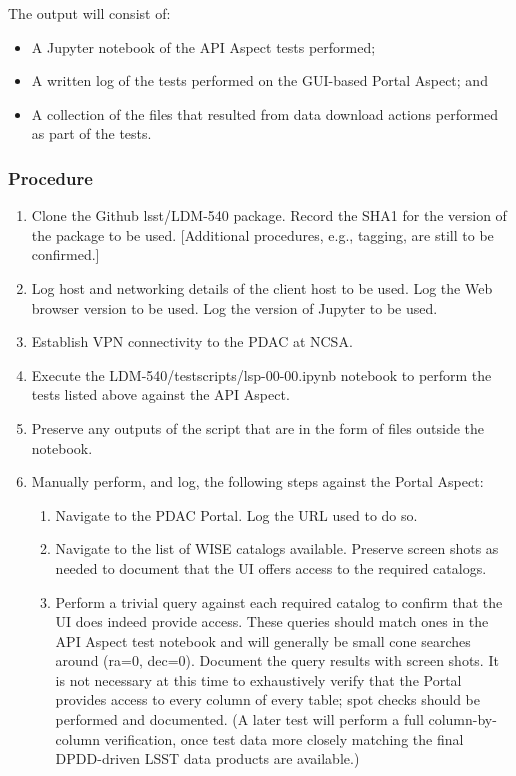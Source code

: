 The output will consist of:

\begin{itemize}
  \item{A Jupyter notebook of the API Aspect tests performed;}
  \item{A written log of the tests performed on the GUI-based Portal Aspect; and}
  \item{A collection of the files that resulted from data download actions performed as part of the tests.}
\end{itemize}


\subsubsection{Procedure}

\begin{enumerate}

  \item{Clone the Github lsst/LDM-540 package.  Record the SHA1 for the version of the package to be used.  [Additional procedures, e.g., tagging, are still to be confirmed.]}
  \item{Log host and networking details of the client host to be used.
 Log the Web browser version to be used.
 Log the version of Jupyter to be used.}
  \item{Establish VPN connectivity to the PDAC at NCSA.}
  \item{Execute the LDM-540/test\textunderscore scripts/lsp-00-00.ipynb notebook to perform the tests listed above against the API Aspect.}
  \item{Preserve any outputs of the script that are in the form of files outside the notebook.}
  \item{Manually perform, and log, the following steps against the Portal Aspect:
    \begin{enumerate}
      \item{Navigate to the PDAC Portal.  Log the URL used to do so.}
      \item{Navigate to the list of WISE catalogs available.  Preserve screen shots as needed to document that the UI offers access to the required catalogs.}
      \item{Perform a trivial query against each required catalog to confirm that the UI does indeed provide access.
 These queries should match ones in the API Aspect test notebook and will generally be small cone searches around (ra=0, dec=0).
 Document the query results with screen shots.
 It is not necessary at this time to exhaustively verify that the Portal provides access to every column of every table; spot checks should be performed and documented.
 (A later test will perform a full column-by-column verification, once test data more closely matching the final DPDD-driven LSST data products are available.)}
    \end{enumerate}
  }

\end{enumerate}

